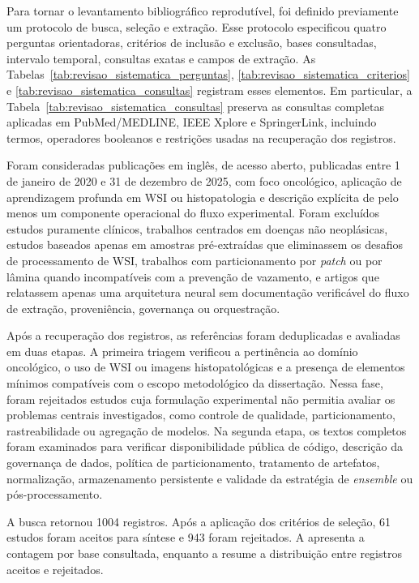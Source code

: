 Para tornar o levantamento bibliográfico reprodutível, foi definido previamente um protocolo de busca, seleção e extração. Esse protocolo especificou quatro perguntas orientadoras, critérios de inclusão e exclusão, bases consultadas, intervalo temporal, consultas exatas e campos de extração. As Tabelas~\ref{tab:revisao_sistematica_perguntas}, \ref{tab:revisao_sistematica_criterios} e \ref{tab:revisao_sistematica_consultas} registram esses elementos. Em particular, a Tabela~\ref{tab:revisao_sistematica_consultas} preserva as consultas completas aplicadas em PubMed/MEDLINE, IEEE Xplore e SpringerLink, incluindo termos, operadores booleanos e restrições usadas na recuperação dos registros.



Foram consideradas publicações em inglês, de acesso aberto, publicadas entre
1 de janeiro de 2020 e 31 de dezembro de 2025, com foco oncológico, aplicação de
aprendizagem profunda em WSI ou histopatologia e descrição explícita de pelo
menos um componente operacional do fluxo experimental. Foram excluídos estudos
puramente clínicos, trabalhos centrados em doenças não neoplásicas, estudos
baseados apenas em amostras pré-extraídas que eliminassem os desafios de
processamento de WSI, trabalhos com particionamento por \textit{patch} ou por
lâmina quando incompatíveis com a prevenção de vazamento, e artigos que
relatassem apenas uma arquitetura neural sem documentação verificável do fluxo
de extração, proveniência, governança ou orquestração.

Após a recuperação dos registros, as referências foram deduplicadas e avaliadas
em duas etapas. A primeira triagem verificou a pertinência ao domínio oncológico,
o uso de WSI ou imagens histopatológicas e a presença de elementos mínimos
compatíveis com o escopo metodológico da dissertação. Nessa fase, foram
rejeitados estudos cuja formulação experimental não permitia avaliar os
problemas centrais investigados, como controle de qualidade, particionamento,
rastreabilidade ou agregação de modelos. Na segunda etapa, os textos completos
foram examinados para verificar disponibilidade pública de código, descrição da
governança de dados, política de particionamento, tratamento de artefatos,
normalização, armazenamento persistente e validade da estratégia de
\textit{ensemble} ou pós-processamento.

A busca retornou 1004 registros. Após a aplicação dos critérios de seleção, 61
estudos foram aceitos para síntese e 943 foram rejeitados. A
 apresenta a contagem por base
consultada, enquanto a  resume a
distribuição entre registros aceitos e rejeitados.

